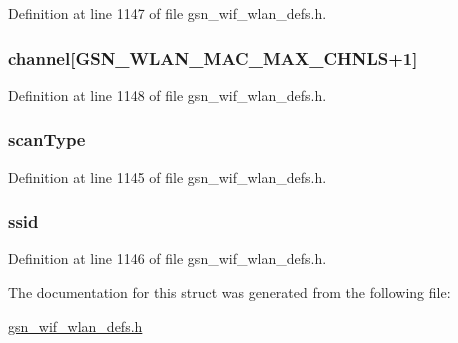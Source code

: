 Definition at line 1147 of file gsn\_\-wif\_\-wlan\_\-defs.h.

\hypertarget{a00402_aaee6d90a2e587462e944c0ab1d4f8151}{
\subsubsection[{channel}]{ {\bf channel}\mbox{[}GSN\_\-WLAN\_\-MAC\_\-MAX\_\-CHNLS+1\mbox{]}}}
\label{a00402_aaee6d90a2e587462e944c0ab1d4f8151}


Definition at line 1148 of file gsn\_\-wif\_\-wlan\_\-defs.h.

\hypertarget{a00402_a000a5568cb4c2c12ad873696b2d6f83e}{
\subsubsection[{scanType}]{ {\bf scanType}}}
\label{a00402_a000a5568cb4c2c12ad873696b2d6f83e}


Definition at line 1145 of file gsn\_\-wif\_\-wlan\_\-defs.h.

\hypertarget{a00402_a9bcb2e5a0dbdd5461faec24950cf7459}{
\subsubsection[{ssid}]{ {\bf ssid}}}
\label{a00402_a9bcb2e5a0dbdd5461faec24950cf7459}


Definition at line 1146 of file gsn\_\-wif\_\-wlan\_\-defs.h.



The documentation for this struct was generated from the following file:\begin{DoxyCompactItemize}
\item 
\hyperlink{a00613}{gsn\_\-wif\_\-wlan\_\-defs.h}\end{DoxyCompactItemize}
